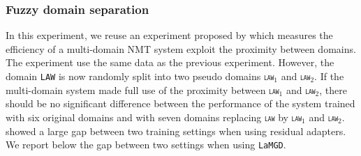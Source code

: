 \documentclass[11pt]{article}
\newcommand{\domain}[1]{\texttt{\textsc{#1}}}
\newcommand{\system}[1]{\texttt{{#1}}}
\begin{document}
\subsubsection{Fuzzy domain separation}
In this experiment, we reuse an experiment proposed by \citet{Pham21revisiting} which measures the efficiency of a multi-domain NMT system exploit the proximity between domains. The experiment use the same data as the previous experiment. However, the domain \domain{LAW} is now randomly split into two pseudo domains \domain{law$_1$} and \domain{law$_2$}. If the multi-domain system made full use of the proximity between \domain{law$_1$} and \domain{law$_2$}, there should be no significant difference between the performance of the system trained with six original domains and with seven domains replacing \domain{law} by \domain{law$_1$} and \domain{law$_2$}. \citet{Pham21revisiting} showed a large gap between two training settings when using residual adapters. We report below the gap between two settings when using \system{LaMGD}. 
\end{document}
